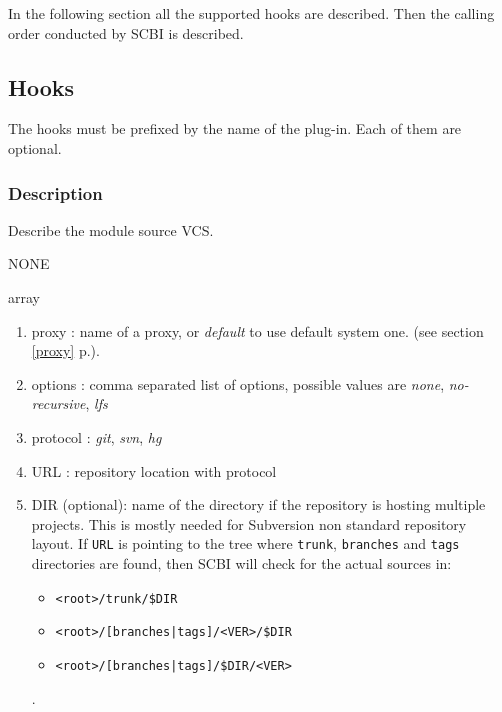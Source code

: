 \documentclass[a4paper,12pt,twoside]{article}
\newcommand{\code}[1]{\texttt{#1}}
\renewcommand{\emph}[1]{\textit{#1}}
\newcommand{\seeref}[1]{see section \ref{#1} p.\pageref{#1}}
\begin{document}
In the following section all the supported hooks are described. Then the calling order conducted by SCBI is described.

\subsection{Hooks}

The hooks must be prefixed by the name of the plug-in. Each of them are optional.

\subsubsection{Description}

\begin{description}[font=\large\texttt]

	\item[<module>{[}-<variant>{]}-vcs] Describe the module source VCS.
	\begin{description}[font=\textit,style=standard]
		\item[parameter] \tabto{2cm} NONE
		\item[return] \tabto{2cm} array
		\begin{enumerate}
			\item proxy : name of a proxy, or \emph{default} to use default system one. (\seeref{proxy}).
			\item options : comma separated list of options, possible values are \emph{none}, \emph{no-recursive}, \emph{lfs}
			\item protocol : \emph{git}, \emph{svn}, \emph{hg}
			\item URL : repository location with protocol
			\item DIR (optional): name of the directory if the repository is hosting multiple projects. This is mostly needed for Subversion non standard repository layout. If \code{URL} is pointing to the tree where \code{trunk}, \code{branches} and \code{tags} directories are found, then SCBI will check for the actual sources in:
			\begin{itemize}
				\item \code{<root>/trunk/\$DIR}
				\item \code{<root>/[branches|tags]/<VER>/\$DIR}
				\item \code{<root>/[branches|tags]/\$DIR/<VER>}
			\end{itemize}.
		\end{enumerate}
	\end{description}


\end{description}
\end{document}
